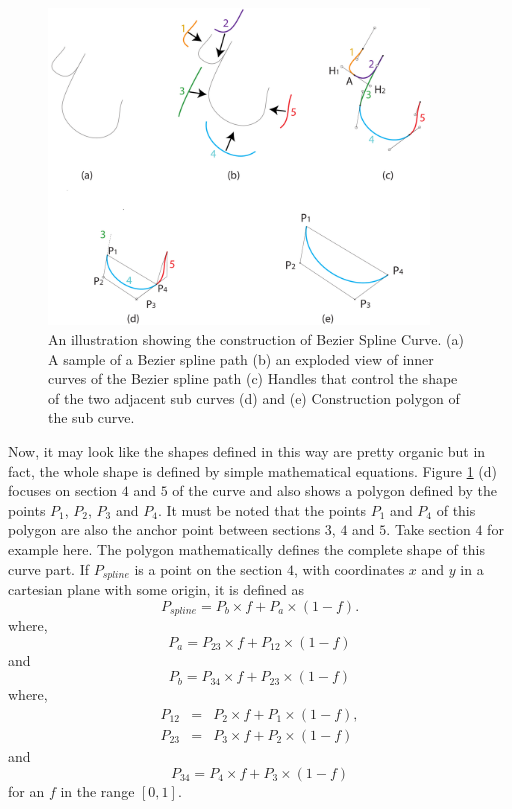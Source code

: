         \begin{figure}
          \centering
          \includegraphics[width=0.9\textwidth]{../Images/BezierSplineCurve.pdf}
          \caption{An illustration showing the construction of Bezier Spline Curve. (a) A sample of a Bezier spline path (b) an exploded view of inner curves of the Bezier spline path (c) Handles that control the shape of the two adjacent sub curves (d) and (e) Construction polygon of the sub curve.
          } \label{Fig:BezierSplines}
        \end{figure}

        Now, it may look like the shapes defined in this way are pretty organic but in fact, the whole shape is defined by simple mathematical equations. Figure \ref{Fig:BezierSplines} (d) focuses on section $4$ and $5$ of the curve and also shows a polygon defined by the points $P_1$, $P_2$, $P_3$ and  $P_4$. It must be noted that the points $P_1$ and $P_4$ of this polygon are also the anchor point between sections $3$, $4$ and $5$. Take section $4$ for example here. The polygon mathematically defines the complete shape of this curve part. If $P_{spline}$ is a point on the section $4$, with coordinates $x$ and $y$ in a cartesian plane with some origin, it is defined as
         \begin{equation}
         P_{spline}=P_b×f+P_a×(1 -f).
         \end{equation}
where,
\begin{equation}
P_a=P_{23}×f+P_{12}×(1 -f)
\end{equation}
and
\begin{equation}
P_b=P_{34}×f+P_{23}×(1 -f)
\end{equation}
where,
\begin{eqnarray}
P_{12}&=&P_2×f+P_1×(1 -f), \\
P_{23}&=&P_3×f+P_2×(1 -f)
\end{eqnarray}
and
\begin{equation}
P_{34}=P_4×f+P_3×(1 -f)
\end{equation}
for an $f$ in the range $[0, 1]$.

